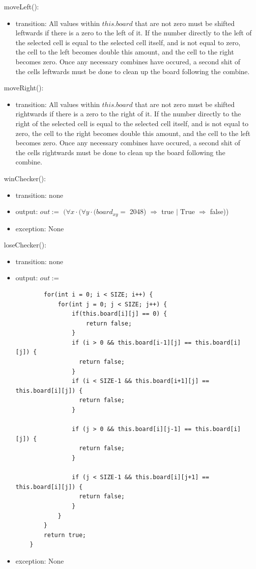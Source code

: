 \documentclass[12pt]{article}
\begin{document}
\noindent moveLeft():
\begin{itemize}
\item transition: All values within $this.board$ that are not zero must be shifted leftwards if there is a zero to the left of it. If the number directly to the left of the selected cell is equal to the selected cell itself, and is not equal to zero, the cell to the left becomes double this amount, and the cell to the right becomes zero. Once any necessary combines have occured, a second shit of the cells leftwards must be done to clean up the board following the combine.
\end{itemize}

\noindent moveRight():
\begin{itemize}
\item transition: All values within $this.board$ that are not zero must be shifted rightwards if there is a zero to the right of it. If the number directly to the right of the selected cell is equal to the selected cell itself, and is not equal to zero, the cell to the right becomes double this amount, and the cell to the left becomes zero. Once any necessary combines have occured, a second shit of the cells rightwards must be done to clean up the board following the combine.
\end{itemize}

\noindent winChecker():
\begin{itemize}
\item transition: none
\item output: $out :=$ $(\forall x \cdot (\forall y \cdot (board_{xy} =$ 2048) $\Rightarrow$ true $|$ $\text{True}$ $\Rightarrow$ false))
\item exception: None
\end{itemize}

\noindent loseChecker():
\begin{itemize}
\item transition: none
\item output: $out :=$ 
\begin{lstlisting}
        for(int i = 0; i < SIZE; i++) {
            for(int j = 0; j < SIZE; j++) {
                if(this.board[i][j] == 0) {
                    return false;
                }
                if (i > 0 && this.board[i-1][j] == this.board[i][j]) {
                  return false;
                }
                if (i < SIZE-1 && this.board[i+1][j] == this.board[i][j]) {
                  return false;
                }

                if (j > 0 && this.board[i][j-1] == this.board[i][j]) {
                  return false;
                }

                if (j < SIZE-1 && this.board[i][j+1] == this.board[i][j]) {
                  return false;
                }
            }
        }
        return true;
    }
\end{lstlisting}

\item exception: None
\end{itemize}
\end{document}
